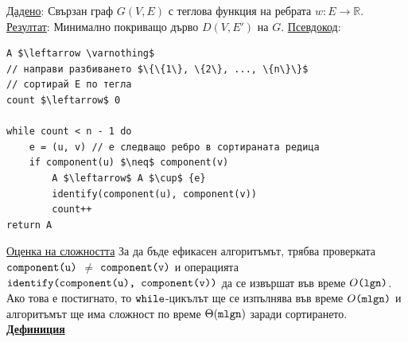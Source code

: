 \documentclass{article}
\begin{document}
\underline{Дадено}: Свързан граф $G(V, E)$ с теглова функция на ребрата $w : E \rightarrow \mathbb{R}$. \newline
\underline{Резултат}: Минимално покриващо дърво $D(V, E')$ на $G$. \newline
\underline{Псевдокод}:
\begin{lstlisting}[style=CStyle]
A $\leftarrow \varnothing$
// направи разбиването $\{\{1\}, \{2\}, ..., \{n\}\}$
// сортирай E по тегла
count $\leftarrow$ 0

while count < n - 1 do
    e = (u, v) // е следващо ребро в сортираната редица
    if component(u) $\neq$ component(v)
        A $\leftarrow$ A $\cup$ {e}
        identify(component(u), component(v))
        count++
return A
\end{lstlisting}
\underline{Оценка на сложността} \newline\newline
За да бъде ефикасен алгоритъмът, трябва проверката $\textnormal{\textcolor{black}{\texttt{component(u)}}}$ $\neq$ $\textnormal{\textcolor{black}{\texttt{component(v)}}}$ и операцията $\textnormal{\textcolor{black}{\texttt{identify(component(u),
component(v))}}}$ да се извършат във време $O\textnormal{\textcolor{black}{\texttt{(lgn)}}}$. Ако това е постигнато, то $\textnormal{\textcolor{black}{\texttt{while}}}$-цикълът ще се изпълнява във време
$O\textnormal{\textcolor{black}{\texttt{(mlgn)}}}$ и алгоритъмът ще има сложност по време $\Theta(\textnormal{\textcolor{black}{\texttt{mlgn}}})$ заради сортирането. \newline\newline
\textbf{\underline{Дефиниция}}
\end{document}
